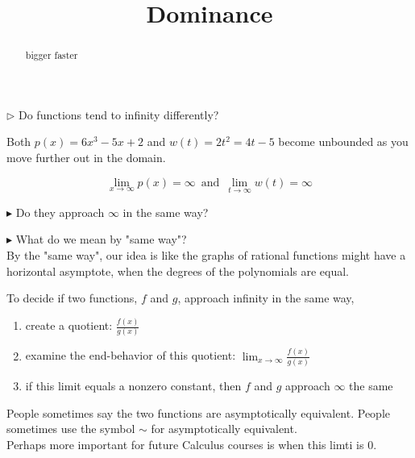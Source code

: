\documentclass{ximera}
\title{Dominance}
\begin{document}
\begin{abstract}
bigger faster
\end{abstract}
\maketitle







$\rhd$ Do functions tend to infinity differently?




Both $p(x) = 6x^3 - 5x + 2$ and $w(t) = 2t^2 = 4t - 5$ become unbounded as you move further out in the domain.



\[    \lim_{x \to \infty} p(x) = \infty  \, \text{ and }  \,       \lim_{t \to \infty} w(t) = \infty                \]

$\blacktriangleright$ Do they approach $\infty$ in the same way? 

$\blacktriangleright$ What do we mean by "same way"?  \\






By the "same way", our idea is like the graphs of rational functions might have a horizontal asymptote, when the degrees of the polynomials are equal.



To decide if two functions, $f$ and $g$, approach infinity in the same way, 

\begin{enumerate}
\item create a quotient: $\frac{f(x)}{g(x)}$ \\


\item examine the end-behavior of this quotient: $\lim_{x \to \infty} \frac{f(x)}{g(x)}$ \\


\item if this limit equals a nonzero constant, then $f$ and $g$ approach $\infty$ the same
\end{enumerate}


People sometimes say the two functions are asymptotically equivalent. People sometimes use the symbol $\sim$ for asymptotically equivalent. \\




Perhaps more important for future Calculus courses is when this limti is $0$. \\
\end{document}
